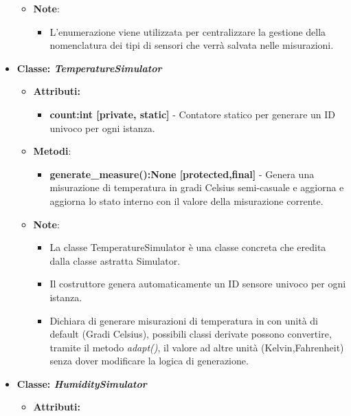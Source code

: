 \begin{itemize}
\begin{itemize}
            \item \textbf{Note}:
            \begin{itemize}
                \item L'enumerazione viene utilizzata per centralizzare la gestione della nomenclatura dei tipi di sensori che verrà salvata nelle misurazioni.
            \end{itemize}
        \end{itemize}
        
        
    \item{\textbf{Classe: \textit{TemperatureSimulator}}}
    \begin{itemize}
        \item \textbf{Attributi:}
    \begin{itemize}
        \item \textbf{count:int [private, static]} - Contatore statico per generare un ID univoco per ogni istanza.
    \end{itemize}
    \item\textbf{Metodi}: 
    \begin{itemize}
        \item \textbf{generate\_measure():None [protected,final]} - Genera una misurazione di temperatura in gradi Celsius semi-casuale e aggiorna e aggiorna lo stato interno con il valore della misurazione corrente.
    \end{itemize}
    \item\textbf{Note}:
    \begin{itemize}
        \item La classe TemperatureSimulator è una classe concreta che eredita dalla classe astratta Simulator.
        \item Il costruttore genera automaticamente un ID sensore univoco per ogni istanza.
        \item Dichiara di generare misurazioni di temperatura in con unità di default (Gradi Celsius), possibili classi derivate possono convertire, tramite il metodo \textit{adapt()}, il valore ad altre unità (Kelvin,Fahrenheit) senza dover modificare la logica di generazione.    \end{itemize}
\end{itemize}
    \item{\textbf{Classe: \textit{HumiditySimulator}}}
    \begin{itemize}
        \item\textbf{Attributi:}
    \begin{itemize}

\end{itemize}
\end{itemize}
\end{itemize}
